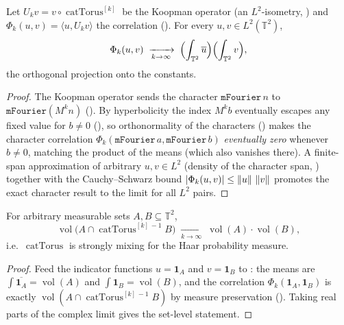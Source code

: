 \begin{theorem}\label{tendsto_catCorr}
  \leanok
  Let \(U_k v = v\circ\operatorname{catTorus}^{[k]}\) be the Koopman operator (an \(L^2\)-isometry,
  ) and \(\Phi_k(u,v) = \langle u, U_k v\rangle\) the
  correlation (). For every \(u,v\in L^2(\mathbb{T}^2)\),
  \[
    \Phi_k(u,v) \;\xrightarrow[k\to\infty]{}\;
      \Bigl(\int_{\mathbb{T}^2}\overline{u}\Bigr)\Bigl(\int_{\mathbb{T}^2} v\Bigr),
  \]
  the orthogonal projection onto the constants.
\end{theorem}
\begin{proof}\leanok
  The Koopman operator sends the character \(\texttt{mFourier}\,n\) to
  \(\texttt{mFourier}(M^{k}n)\) (). By
  hyperbolicity the index \(M^{k}b\) eventually escapes any fixed value for \(b\ne 0\)
  (), so orthonormality of the characters
  () makes the character correlation
  \(\Phi_k(\texttt{mFourier}\,a,\texttt{mFourier}\,b)\) \emph{eventually zero} whenever \(b\ne 0\),
  matching the product of the means (which also vanishes there). A finite-span approximation of
  arbitrary \(u,v\in L^2\) (density of the character span,
  ) together with the Cauchy--Schwarz bound
  \(\left\lvert \Phi_k(u,v) \right\rvert\le\left\lVert u \right\rVert\,\left\lVert v \right\rVert\) promotes the exact character result to the limit for all
  \(L^2\) pairs.
\end{proof}

\begin{theorem}\label{catTorus_mixing}
  \leanok
  For arbitrary measurable sets \(A,B\subseteq\mathbb{T}^2\),
  \[
    \operatorname{vol}\bigl(A\cap\operatorname{catTorus}^{[k]\,-1}B\bigr)
      \;\xrightarrow[k\to\infty]{}\;
      \operatorname{vol}(A)\cdot\operatorname{vol}(B),
  \]
  i.e.\ \(\operatorname{catTorus}\) is strongly mixing for the Haar probability measure.
\end{theorem}
\begin{proof}\leanok
  Feed the indicator functions \(u = \mathbf 1_A\) and \(v = \mathbf 1_B\) to
  : the means are \(\int\overline{\mathbf 1_A} = \operatorname{vol}(A)\) and
  \(\int\mathbf 1_B = \operatorname{vol}(B)\), and the correlation \(\Phi_k(\mathbf 1_A,\mathbf 1_B)\)
  is exactly \(\operatorname{vol}(A\cap\operatorname{catTorus}^{[k]\,-1}B)\) by measure preservation
  (). Taking real parts of the complex limit gives the set-level
  statement.
\end{proof}

